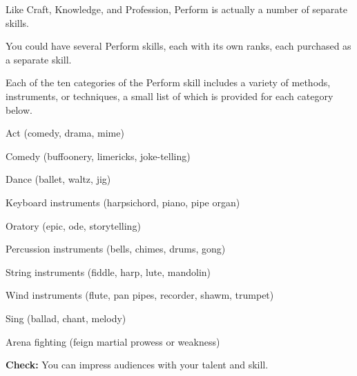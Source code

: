 Like Craft, Knowledge, and Profession, Perform is actually a number of separate skills.

You could have several Perform skills, each with its own ranks, each purchased as a separate skill.

Each of the ten categories of the Perform skill includes a variety of methods, instruments, or techniques, a small list of which is provided for each category below.

\begin{itemize*}
\item Act (comedy, drama, mime)
\item Comedy (buffoonery, limericks, joke-telling)
\item Dance (ballet, waltz, jig)
\item Keyboard instruments (harpsichord, piano, pipe organ)
\item Oratory (epic, ode, storytelling)
\item Percussion instruments (bells, chimes, drums, gong)
\item String instruments (fiddle, harp, lute, mandolin)
\item Wind instruments (flute, pan pipes, recorder, shawm, trumpet)
\item Sing (ballad, chant, melody)
\item Arena fighting (feign martial prowess or weakness)
\end{itemize*}

\textbf{Check:} You can impress audiences with your talent and skill.


